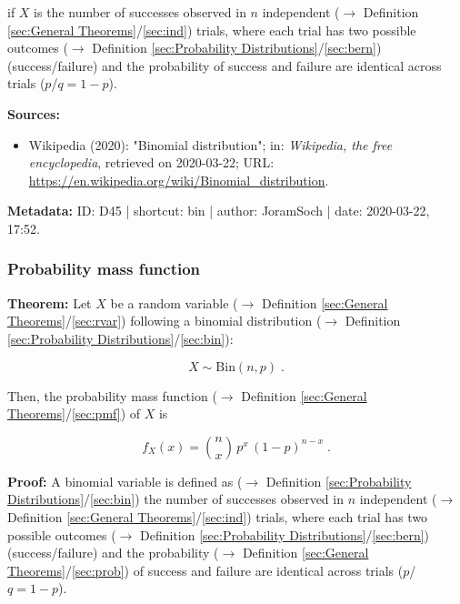 \documentclass[a4paper,12pt,twoside]{book}
\begin{document}
if $X$ is the number of successes observed in $n$ independent ($\rightarrow$ Definition \ref{sec:General Theorems}/\ref{sec:ind}) trials, where each trial has two possible outcomes ($\rightarrow$ Definition \ref{sec:Probability Distributions}/\ref{sec:bern}) (success/failure) and the probability of success and failure are identical across trials ($p$/$q = 1-p$).


\vspace{1em}
\textbf{Sources:}
\begin{itemize}
\item Wikipedia (2020): "Binomial distribution"; in: \textit{Wikipedia, the free encyclopedia}, retrieved on 2020-03-22; URL: \url{https://en.wikipedia.org/wiki/Binomial_distribution}.
\end{itemize}


\vspace{1em}
\textbf{Metadata:} ID: D45 | shortcut: bin | author: JoramSoch | date: 2020-03-22, 17:52.
\vspace{1em}



\subsubsection[\textbf{Probability mass function}]{Probability mass function} \label{sec:bin-pmf}
\setcounter{equation}{0}

\textbf{Theorem:} Let $X$ be a random variable ($\rightarrow$ Definition \ref{sec:General Theorems}/\ref{sec:rvar}) following a binomial distribution ($\rightarrow$ Definition \ref{sec:Probability Distributions}/\ref{sec:bin}):

\begin{equation} \label{eq:bin-pmf-bin}
X \sim \mathrm{Bin}(n,p) \; .
\end{equation}

Then, the probability mass function ($\rightarrow$ Definition \ref{sec:General Theorems}/\ref{sec:pmf}) of $X$ is

\begin{equation} \label{eq:bin-pmf-bin-pmf}
f_X(x) = {n \choose x} \, p^x \, (1-p)^{n-x} \; .
\end{equation}


\vspace{1em}
\textbf{Proof:} A binomial variable is defined as ($\rightarrow$ Definition \ref{sec:Probability Distributions}/\ref{sec:bin}) the number of successes observed in $n$ independent ($\rightarrow$ Definition \ref{sec:General Theorems}/\ref{sec:ind}) trials, where each trial has two possible outcomes ($\rightarrow$ Definition \ref{sec:Probability Distributions}/\ref{sec:bern}) (success/failure) and the probability ($\rightarrow$ Definition \ref{sec:General Theorems}/\ref{sec:prob}) of success and failure are identical across trials ($p$/$q = 1-p$).
\end{document}
